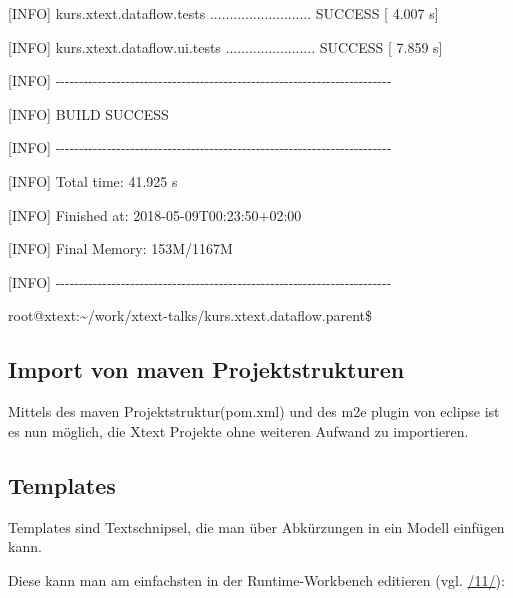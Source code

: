 \documentclass[a4]{article}
\begin{document}
{[}INFO{]} kurs.xtext.dataflow.tests .......................... SUCCESS
{[} 4.007 s{]}

{[}INFO{]} kurs.xtext.dataflow.ui.tests ....................... SUCCESS
{[} 7.859 s{]}

{[}INFO{]}
-\/-\/-\/-\/-\/-\/-\/-\/-\/-\/-\/-\/-\/-\/-\/-\/-\/-\/-\/-\/-\/-\/-\/-\/-\/-\/-\/-\/-\/-\/-\/-\/-\/-\/-\/-\/-\/-\/-\/-\/-\/-\/-\/-\/-\/-\/-\/-\/-\/-\/-\/-\/-\/-\/-\/-\/-\/-\/-\/-\/-\/-\/-\/-\/-\/-\/-\/-\/-\/-\/-\/-

{[}INFO{]} BUILD SUCCESS

{[}INFO{]}
-\/-\/-\/-\/-\/-\/-\/-\/-\/-\/-\/-\/-\/-\/-\/-\/-\/-\/-\/-\/-\/-\/-\/-\/-\/-\/-\/-\/-\/-\/-\/-\/-\/-\/-\/-\/-\/-\/-\/-\/-\/-\/-\/-\/-\/-\/-\/-\/-\/-\/-\/-\/-\/-\/-\/-\/-\/-\/-\/-\/-\/-\/-\/-\/-\/-\/-\/-\/-\/-\/-\/-

{[}INFO{]} Total time: 41.925 s

{[}INFO{]} Finished at: 2018-05-09T00:23:50+02:00

{[}INFO{]} Final Memory: 153M/1167M

{[}INFO{]}
-\/-\/-\/-\/-\/-\/-\/-\/-\/-\/-\/-\/-\/-\/-\/-\/-\/-\/-\/-\/-\/-\/-\/-\/-\/-\/-\/-\/-\/-\/-\/-\/-\/-\/-\/-\/-\/-\/-\/-\/-\/-\/-\/-\/-\/-\/-\/-\/-\/-\/-\/-\/-\/-\/-\/-\/-\/-\/-\/-\/-\/-\/-\/-\/-\/-\/-\/-\/-\/-\/-\/-

root@xtext:\textasciitilde{}/work/xtext-talks/kurs.xtext.dataflow.parent\$

\subsection[Import von maven
Projektstrukturen]{\texorpdfstring{\protect\hypertarget{anchor-52}{}{}Import
von maven
Projektstrukturen}{Import von maven Projektstrukturen}}\label{import-von-maven-projektstrukturen}

Mittels des maven Projektstruktur(pom.xml) und des m2e plugin von
eclipse ist es nun möglich, die Xtext Projekte ohne weiteren Aufwand zu
importieren.

\subsection[Templates]{\texorpdfstring{\protect\hypertarget{anchor-53}{}{}Templates}{Templates}}\label{templates}

Templates sind Textschnipsel, die man über Abkürzungen in ein Modell
einfügen kann.

Diese kann man am einfachsten in der Runtime-Workbench editieren (vgl.
\protect\hyperlink{anchor-13}{/11/}):
\end{document}

